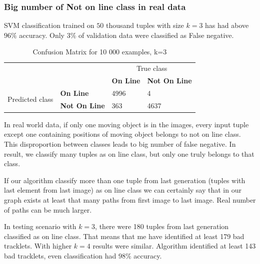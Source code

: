 \subsubsection{Big number of Not on line class in real data}
SVM classification trained on $50$ thousand tuples with size $k=3$ has had above $96\%$ accuracy. Only $ 3\% $ of validation data were classified as False negative.  


\begin{center}
\begin{table}[!h]
\renewcommand{\arraystretch}{2}
\begin{tabular}{ p{2cm} p{3cm} p{5cm} p{3cm} | } 
\cline{3-4}
& & \multicolumn{2}{|c|}{True class}\\
\cline{3-4}
 &  & \multicolumn{1}{|l|}{\textbf{On Line}}& \multicolumn{1}{|l|}{\textbf{Not On Line}} \\
\hline
\multicolumn{1}{|l|}{\multirow{2}{4em}{Predicted class}} & \multicolumn{1}{|l|}{\textbf{On Line}} & \multicolumn{1}{|l|}{4996}  & \multicolumn{1}{|l|}{4} \\
\cline{2-4}
\multicolumn{1}{|l|}{} & \multicolumn{1}{|l|}{\textbf{Not On Line}} & \multicolumn{1}{|l|}{363}  & \multicolumn{1}{|l|}{4637}  \\
\hline
\end{tabular}
\renewcommand{\arraystretch}{1}
\caption{Confusion Matrix for 10 000 examples, k=3}
\label{tab:svm_conf_matrix}
\end{table}
\end{center}

In real world data, if only one moving object is in the images, every input tuple except one containing positions of moving object belongs to not on line class. This disproportion between classes leads to big number of false negative. In result, we classify many tuples as on line class, but only one truly belongs to that class. 

If our algorithm classify more than one tuple from last generation (tuples with last element from last image) as on line class we can certainly say that in our graph exists at least that many paths from first image to last image. Real number of paths can be much larger.

In testing scenario with $k=3$, there were 180 tuples from last generation classified as on line class. That means that me have identified at least 179 bad tracklets. With higher $k=4$ results were similar. Algorithm identified at least 143 bad tracklets, even classification had $98\%$ accuracy. 

